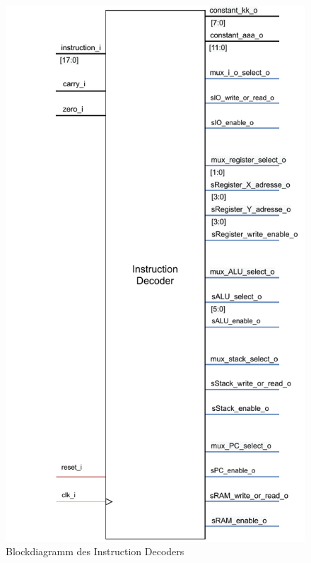 \documentclass[bibliography=totoc,listof=totoc,index=totoc]{scrartcl}
\begin{document}
\begin{multicols}{2}
\begin{figure}[H]
    \includegraphics[height=0.5\textheight]{ID_beschreibung.pdf}
    \caption{Blockdiagramm des Instruction Decoders}
    \label{fig:Block_InstructionDecoder}
\end{figure}
\end{multicols}
\end{document}
